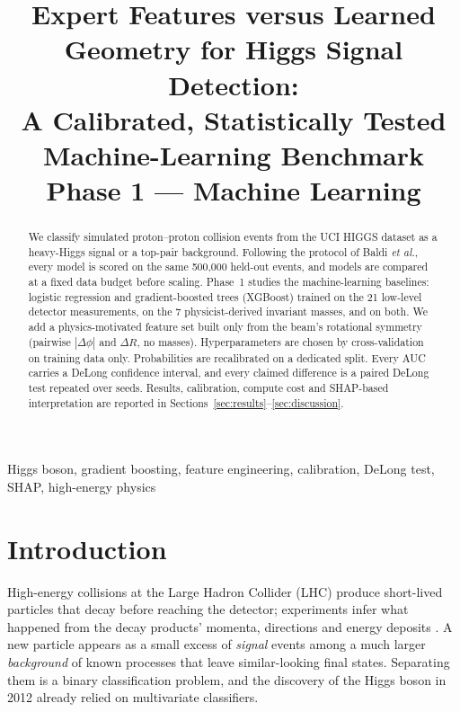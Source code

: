 \documentclass[conference]{IEEEtran}
\begin{document}
\title{Expert Features versus Learned Geometry for Higgs Signal Detection:\\
A Calibrated, Statistically Tested Machine-Learning Benchmark\\
\large Phase 1 --- Machine Learning}

\author{
}

\maketitle

\begin{abstract}
We classify simulated proton--proton collision events from the UCI HIGGS dataset as a heavy-Higgs
signal or a top-pair background. Following the protocol of Baldi \emph{et al.}, every model is
scored on the same 500{,}000 held-out events, and models are compared at a fixed data budget before
scaling. Phase~1 studies the machine-learning baselines: logistic regression and gradient-boosted
trees (XGBoost) trained on the 21 low-level detector measurements, on the 7 physicist-derived
invariant masses, and on both. We add a physics-motivated feature set built only from the beam's
rotational symmetry (pairwise $|\Delta\phi|$ and $\Delta R$, no masses). Hyperparameters are chosen
by cross-validation on training data only. Probabilities are recalibrated on a dedicated split.
Every AUC carries a DeLong confidence interval, and every claimed difference is a paired DeLong test
repeated over seeds. Results, calibration, compute cost and SHAP-based interpretation are reported in
Sections~\ref{sec:results}--\ref{sec:discussion}.
\end{abstract}

\begin{IEEEkeywords}
Higgs boson, gradient boosting, feature engineering, calibration, DeLong test, SHAP, high-energy physics
\end{IEEEkeywords}

\section{Introduction}
High-energy collisions at the Large Hadron Collider (LHC) produce short-lived particles that decay
before reaching the detector; experiments infer what happened from the decay products' momenta,
directions and energy deposits \cite{guest2018deep}. A new particle appears as a small excess of
\emph{signal} events among a much larger \emph{background} of known processes that leave
similar-looking final states. Separating them is a binary classification problem, and the
discovery of the Higgs boson in 2012 \cite{atlas2012observation,cms2012observation} already relied on
multivariate classifiers.
\end{document}
